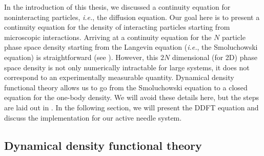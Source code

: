 In the introduction of this thesis, we discussed a continuity equation for
noninteracting particles, \textit{i.e.}, the diffusion equation. Our goal here
is to present a continuity equation for the density of interacting particles
starting from microscopic interactions. Arriving at a continuity equation for
the $N$ particle phase space density starting from the Langevin
equation (\textit{i.e.}, the Smoluchowski equation) is straightforward (see
).  However, this $2N$ dimensional (for 2D) phase
space density is not only numerically intractable for large systems, it does not
correspond to an experimentally measurable quantity. Dynamical density
functional theory allows us to go from the Smoluchowski equation to a closed
equation for the one-body density.  We will avoid these details here, but the
steps are laid out in .  In the following section, we will
present the DDFT equation and discuss the implementation for our active needle
system.

\subsection{Dynamical density functional theory}

